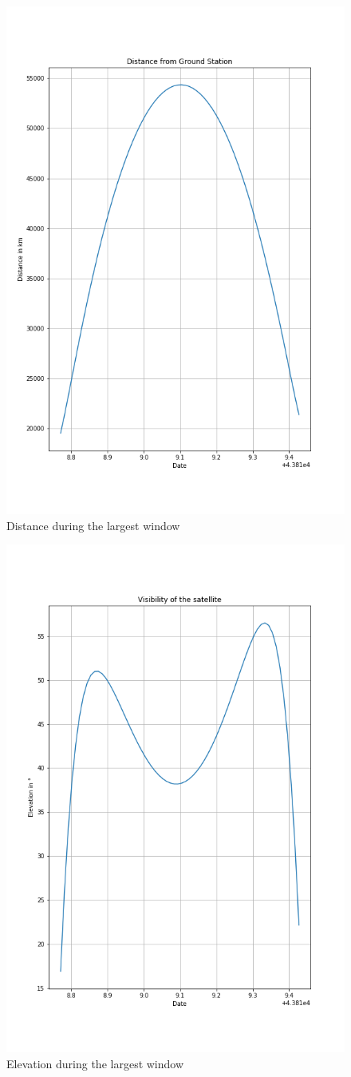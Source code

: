 \documentclass[a4paper,12pt,calibri,oneside,openany]{book}
\theoremstyle{break}
\begin{document}
\begin{figure}[H]
	\centering
	\includegraphics[width=0.7\linewidth]{windowdist}
	\caption{Distance during the largest window}
\end{figure}
\begin{figure}[H]
	\centering
	\includegraphics[width=0.7\linewidth]{windowalt}
	\caption{Elevation during the largest window}
\end{figure}
\end{document}
